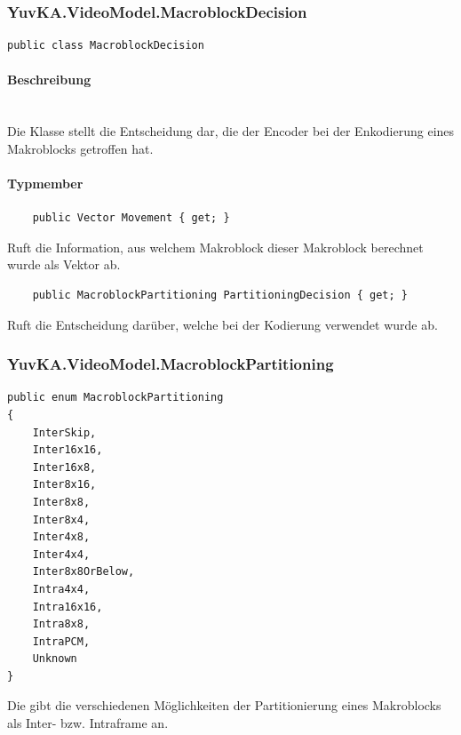 \subsubsection{YuvKA.VideoModel.MacroblockDecision}

\begin{verbatim}
public class MacroblockDecision
\end{verbatim}

\paragraph{Beschreibung}~\\
Die Klasse  stellt die Entscheidung dar, die der Encoder bei der Enkodierung eines Makroblocks getroffen hat.

\paragraph{Typmember}
\begin{itemize}

	\begin{verbatim}
	public Vector Movement { get; }
	\end{verbatim}
	Ruft die Information, aus welchem Makroblock dieser Makroblock berechnet wurde als Vektor ab.

	\begin{verbatim}
	public MacroblockPartitioning PartitioningDecision { get; }
	\end{verbatim}
	Ruft die Entscheidung darüber, welche  bei der Kodierung verwendet wurde ab.

\end{itemize}

\subsubsection{YuvKA.VideoModel.MacroblockPartitioning}

\begin{verbatim}
public enum MacroblockPartitioning
{
    InterSkip,
    Inter16x16,
    Inter16x8,
    Inter8x16,
    Inter8x8,
    Inter8x4,
    Inter4x8,
    Inter4x4,
    Inter8x8OrBelow,
    Intra4x4,
    Intra16x16,
    Intra8x8,
    IntraPCM,
    Unknown
}
\end{verbatim}
Die  gibt die verschiedenen Möglichkeiten der Partitionierung eines Makroblocks als Inter- bzw. Intraframe an.
